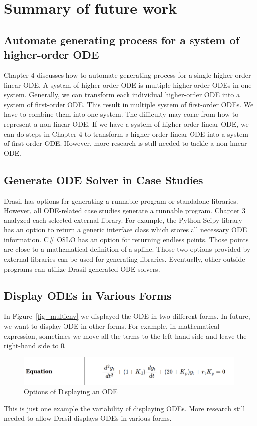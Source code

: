 \chapter{Summary of future work}

\section{Automate generating process for a system of higher-order ODE}
Chapter 4 discusses how to automate generating process for a single higher-order linear ODE. A system of higher-order ODE is multiple higher-order ODEs in one system. Generally, we can transform each individual higher-order ODE into a system of first-order ODE. This result in multiple system of first-order ODEs. We have to combine them into one system. The difficulty may come from how to represent a non-linear ODE. If we have a system of higher-order linear ODE, we can do steps in Chapter 4 to transform a higher-order linear ODE into a system of first-order ODE. However, more research is still needed to tackle a non-linear ODE.

\section{Generate ODE Solver in Case Studies}
Drasil has options for generating a runnable program or standalone libraries. However, all ODE-related case studies generate a runnable program. Chapter 3 analyzed each selected external library. For example, the Python Scipy library has an option to return a generic interface class which stores all necessary ODE information. C\# OSLO has an option for returning endless points. Those points are close to a mathematical definition of a spline. Those two options provided by external libraries can be used for generating libraries. Eventually, other outside programs can utilize Drasil generated ODE solvers.

\section{Display ODEs in Various Forms}
In Figure~\ref{fig_multienv} we displayed the ODE in two different forms. In future, we want to display ODE in other forms. For example, in mathematical expression, sometimes we move all the terms to the left-hand side and leave the right-hand side to 0.
\begin{figure}[ht]
\centering	
\includegraphics[width=1\textwidth]{figures/ODEVariousForm.png}
\caption{Options of Displaying an ODE}
\label{fig_odevariousform}
\end{figure}
This is just one example the variability of displaying ODEs. More research still needed to allow Drasil displays ODEs in various forms.

